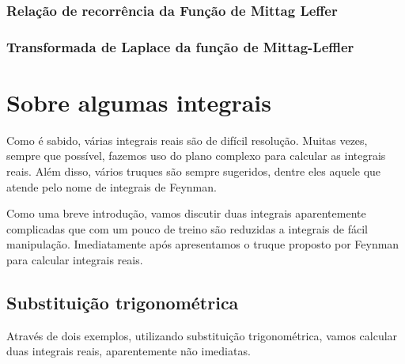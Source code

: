 \subsection{Relação de recorrência da Função de Mittag Leffer}







\subsection{Transformada de Laplace da função de Mittag-Leffler}




\chapter{Sobre algumas integrais}

Como é sabido, várias integrais reais são de difícil resolução. Muitas vezes, sempre que possível, fazemos uso do plano complexo para calcular as integrais reais. Além disso, vários truques são sempre sugeridos, dentre eles aquele que atende pelo nome de integrais de Feynman.

Como uma breve introdução, vamos discutir duas integrais aparentemente complicadas que com um pouco de treino são reduzidas a integrais de fácil manipulação. Imediatamente após apresentamos o truque proposto por Feynman para calcular integrais reais.

\section{Substituição trigonométrica}

Através de dois exemplos, utilizando substituição trigonométrica, vamos calcular duas integrais reais, aparentemente não imediatas.


